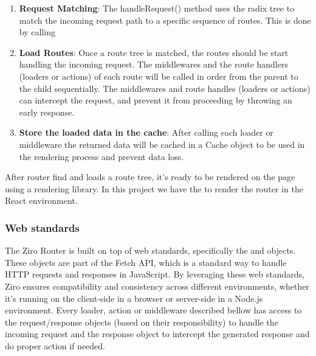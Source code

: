 \begin{enumerate}
  \item \textbf{Request Matching}: The handleRequest() method uses the radix tree to match the incoming request path to a specific sequence of routes. This is done by calling 

  \item \textbf{Load Routes}: Once a route tree is matched, the routes should be start handling the incoming request. The middlewares and the route handlers (loaders or actions) of each route will be called in order from the parent to the child sequentially. The middlewares and route handles (loaders or actions) can intercept the request, and prevent it from proceeding by throwing an early response.

  \item \textbf{Store the loaded data in the cache}: After calling each loader or middleware the returned data will be cached in a Cache object to be used in the rendering process and prevent data loss.

\end{enumerate}

After router find and loads a route tree, it's ready to be rendered on the page using a rendering library. In this project we have the  to render the router in the React environment.


\subsubsection{Web standards}

The Ziro Router is built on top of web standards, specifically the  and  objects. These objects are part of the Fetch API, which is a standard way to handle HTTP requests and responses in JavaScript. By leveraging these web standards, Ziro ensures compatibility and consistency across different environments, whether it's running on the client-side in a browser or server-side in a Node.js environment. Every loader, action or middleware described bellow has access to the request/response objects (based on their responsibility) to handle the incoming request and the response object to intercept the generated response and do proper action if needed.



